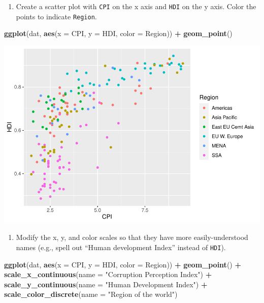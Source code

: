 \documentclass[
]{book}
\newenvironment{Shaded}{\begin{snugshade}}{\end{snugshade}}
\newcommand{\DataTypeTok}[1]{\textcolor[rgb]{0.13,0.29,0.53}{#1}}
\newcommand{\KeywordTok}[1]{\textcolor[rgb]{0.13,0.29,0.53}{\textbf{#1}}}
\newcommand{\NormalTok}[1]{#1}
\newcommand{\OperatorTok}[1]{\textcolor[rgb]{0.81,0.36,0.00}{\textbf{#1}}}
\newcommand{\StringTok}[1]{\textcolor[rgb]{0.31,0.60,0.02}{#1}}
\providecommand{\tightlist}{%
  \setlength{\itemsep}{0pt}\setlength{\parskip}{0pt}}
\begin{document}
\begin{alert}

\begin{enumerate}
\def\labelenumi{\arabic{enumi}.}
\tightlist
\item
  Create a scatter plot with \texttt{CPI} on the x axis and \texttt{HDI} on the y axis. Color the points to indicate \texttt{Region}.
\end{enumerate}

\begin{Shaded}
\begin{Highlighting}[]
\KeywordTok{ggplot}\NormalTok{(dat, }\KeywordTok{aes}\NormalTok{(}\DataTypeTok{x =}\NormalTok{ CPI, }\DataTypeTok{y =}\NormalTok{ HDI, }\DataTypeTok{color =}\NormalTok{ Region)) }\OperatorTok{+}
\StringTok{  }\KeywordTok{geom\_point}\NormalTok{()}
\end{Highlighting}
\end{Shaded}

\includegraphics{R/Rgraphics/figures/unnamed-chunk-190-1.pdf}

\begin{enumerate}
\def\labelenumi{\arabic{enumi}.}
\setcounter{enumi}{1}
\tightlist
\item
  Modify the x, y, and color scales so that they have more easily-understood names (e.g., spell out ``Human development Index'' instead of \texttt{HDI}).
\end{enumerate}

\begin{Shaded}
\begin{Highlighting}[]
\KeywordTok{ggplot}\NormalTok{(dat, }\KeywordTok{aes}\NormalTok{(}\DataTypeTok{x =}\NormalTok{ CPI, }\DataTypeTok{y =}\NormalTok{ HDI, }\DataTypeTok{color =}\NormalTok{ Region)) }\OperatorTok{+}
\StringTok{  }\KeywordTok{geom\_point}\NormalTok{() }\OperatorTok{+}
\StringTok{  }\KeywordTok{scale\_x\_continuous}\NormalTok{(}\DataTypeTok{name =} \StringTok{"Corruption Perception Index"}\NormalTok{) }\OperatorTok{+}
\StringTok{  }\KeywordTok{scale\_y\_continuous}\NormalTok{(}\DataTypeTok{name =} \StringTok{"Human Development Index"}\NormalTok{) }\OperatorTok{+}
\StringTok{  }\KeywordTok{scale\_color\_discrete}\NormalTok{(}\DataTypeTok{name =} \StringTok{"Region of the world"}\NormalTok{)}
\end{Highlighting}
\end{Shaded}


\end{alert}
\end{document}
